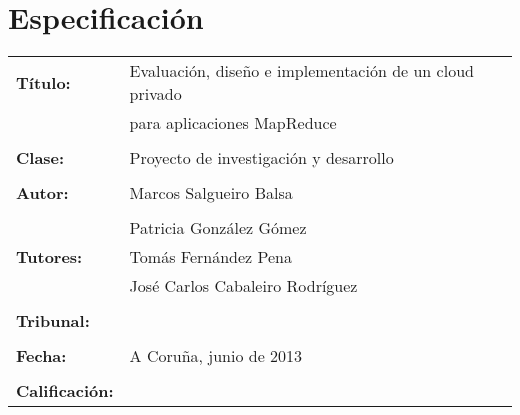 \chapter*{Especificaci\'on}\label{sec:spec}

\begin{flushleft}
    \begin{tabular}{l l}
        \textbf{T\'itulo:} & Evaluaci\'on, dise\~no e implementaci\'on de un cloud privado\\
        & para aplicaciones MapReduce \\
        & \\
        \textbf{Clase:} & Proyecto de investigaci\'on y desarrollo \\
        & \\
        \textbf{Autor:} & Marcos Salgueiro Balsa \\
        & \\
        & Patricia Gonz\'alez G\'omez \\
        \textbf{Tutores:} & Tom\'as Fern\'andez Pena \\
        & Jos\'e Carlos Cabaleiro Rodr\'iguez \\
        & \\
        \textbf{Tribunal:} \\
        & \\
        \textbf{Fecha:} & A Coru\~na, junio de 2013 \\
        & \\
        \textbf{Calificaci\'on:}
    \end{tabular}
\end{flushleft}

